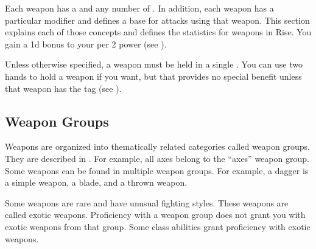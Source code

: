     Each weapon has a  and any number of .
    In addition, each weapon has a particular  modifier and defines a base  for attacks using that weapon.
    This section explains each of those concepts and defines the statistics for weapons in Rise.
    You gain a \plus1d bonus to your  per 2 power (see ).

    Unless otherwise specified, a weapon must be held in a single .
    You can use two hands to hold a weapon if you want, but that provides no special benefit unless that weapon has the  tag (see ).

    \subsection{Weapon Groups}\label{Weapon Groups}

        Weapons are organized into thematically related categories called weapon groups. They are described in . For example, all axes belong to the ``axes'' weapon group. Some weapons can be found in multiple weapon groups. For example, a dagger is a simple weapon, a blade, and a thrown weapon.

        \label{Exotic Weapons} Some weapons are rare and have unusual fighting styles.
        These weapons are called exotic weapons.
        Proficiency with a weapon group does not grant you with exotic weapons from that group.
        Some class abilities grant proficiency with exotic weapons.

